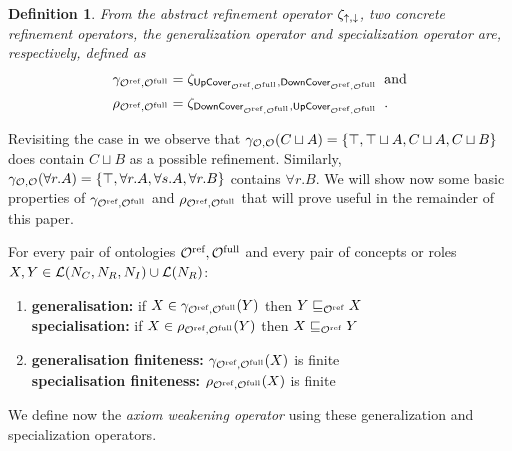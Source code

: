 \documentclass[
]{ceurart}
\newtheorem{definition}{Definition}
\begin{document}
\begin{definition}
  From the abstract refinement operator $\zeta_{\mathop{\uparrow},\mathop{\downarrow}}$, two concrete refinement operators, the \emph{generalization operator} and \emph{specialization operator} are, respectively, defined as
  \begin{align*}
    \gamma_{{\mathcal{O}^\textnormal{ref}},{\mathcal{O}^\textnormal{full}}} &= \zeta_{{\mathsf{UpCover}}_{{\mathcal{O}^\textnormal{ref}},{\mathcal{O}^\textnormal{full}}},{\mathsf{DownCover}}_{{\mathcal{O}^\textnormal{ref}},{\mathcal{O}^\textnormal{full}}}} \enspace \text{and} \\
    \rho_{{\mathcal{O}^\textnormal{ref}},{\mathcal{O}^\textnormal{full}}} &= \zeta_{{\mathsf{DownCover}}_{{\mathcal{O}^\textnormal{ref}},{\mathcal{O}^\textnormal{full}}},{\mathsf{UpCover}}_{{\mathcal{O}^\textnormal{ref}},{\mathcal{O}^\textnormal{full}}}} \enspace.
  \end{align*}
\end{definition}

Revisiting the case in  we observe that $\gamma_{\mathcal{O},\mathcal{O}}(C \sqcup A) = \{ \top, \top \sqcup A, C \sqcup A, C \sqcup B \}$ does contain $C \sqcup B$ as a possible refinement. Similarly, $\gamma_{\mathcal{O},\mathcal{O}}(\forall r.A) = \{ \top, \forall r.A, \forall s.A, \forall r.B \}$ contains $\forall r.B$. We will show now some basic properties of $\gamma_{{\mathcal{O}^\textnormal{ref}},{\mathcal{O}^\textnormal{full}}}$ and $\rho_{{\mathcal{O}^\textnormal{ref}},{\mathcal{O}^\textnormal{full}}}$ that will prove useful in the remainder of this paper.

\begin{lemma}\label{lem:basic}
  For every pair of \SROIQ ontologies ${\mathcal{O}^\textnormal{ref}}, {\mathcal{O}^\textnormal{full}}$ and every pair of concepts or roles $X, Y \in \mathcal{L}(N_C, N_R, N_I) \cup \mathcal{L}(N_R)$:
  \newcommand\litem[1]{\item{\bfseries #1:\enspace }}
  \begin{enumerate}
    \litem{generalisation}\label{lem:generalisation} if $X \in \gamma_{{\mathcal{O}^\textnormal{ref}},{\mathcal{O}^\textnormal{full}}}(Y)$ then $Y \sqsubseteq_{{\mathcal{O}^\textnormal{ref}}} X$ \\
    \textbf{specialisation:\enspace} if $X \in \rho_{{\mathcal{O}^\textnormal{ref}},{\mathcal{O}^\textnormal{full}}}(Y)$ then $X \sqsubseteq_{{\mathcal{O}^\textnormal{ref}}} Y$
    \litem{generalisation finiteness} $\gamma_{{\mathcal{O}^\textnormal{ref}},{\mathcal{O}^\textnormal{full}}}(X)$ is finite \\
    \textbf{specialisation finiteness:\enspace} $\rho_{{\mathcal{O}^\textnormal{ref}},{\mathcal{O}^\textnormal{full}}}(X)$ is finite
  \end{enumerate}
\end{lemma}

We define now the \emph{axiom weakening operator} using these generalization and specialization operators.
\end{document}
